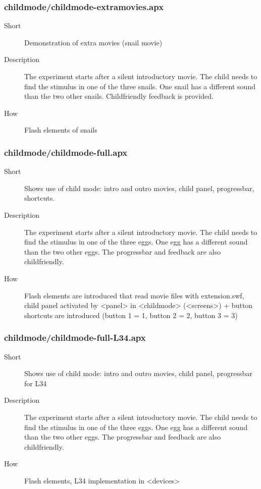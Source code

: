 \subsubsection{childmode/childmode-extramovies.apx}
\begin{description}
\item[Short] 
 Demonstration of extra movies (snail movie)
\item[Description] 
 The experiment starts after a silent introductory movie. The child needs to find the stimulus in one of the three snails. One snail has a different sound than the two other snails. Childfriendly feedback is provided.
\item[How] 
 Flash elements of snails
\end{description}

\subsubsection{childmode/childmode-full.apx}
\begin{description}
\item[Short] 
 Shows use of child mode: intro and outro movies, child panel, progressbar, shortcuts.
\item[Description] 
 The experiment starts after a silent introductory movie. The child needs to find the stimulus in one of the three eggs. One egg has a different sound than the two other eggs. The progressbar and feedback are also childfriendly.
\item[How] 
 Flash elements are introduced that read movie files with extension.swf, child panel activated by \textless{}panel\textgreater{} in \textless{}childmode\textgreater{} (\textless{}screens\textgreater{}) + button shortcuts are introduced (button 1 = 1, button 2 = 2, button 3 = 3)
\end{description}

\subsubsection{childmode/childmode-full-L34.apx}
\begin{description}
\item[Short] 
 Shows use of child mode: intro and outro movies, child panel, progressbar for L34
\item[Description] 
 The experiment starts after a silent introductory movie. The child needs to find the stimulus in one of the three eggs. One egg has a different sound than the two other eggs.  The progressbar and feedback are also childfriendly.
\item[How] 
 Flash elements, L34 implementation in \textless{}devices\textgreater{}
\end{description}

